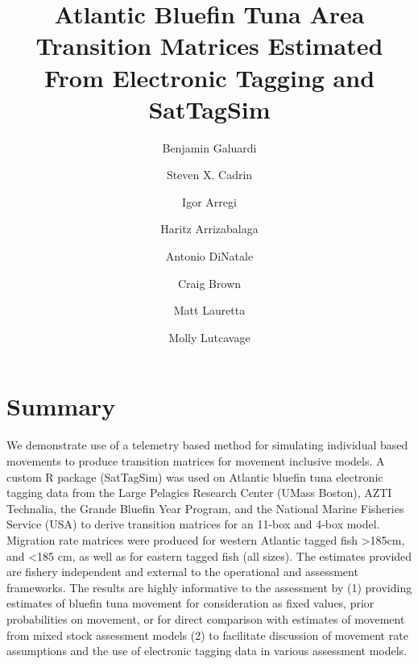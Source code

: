 \documentclass[
  authoryear,
  preprint,
  5p,
  onecolumn]{elsarticle}
\begin{document}
\begin{frontmatter}
\title{Atlantic Bluefin Tuna Area Transition Matrices Estimated From
Electronic Tagging and SatTagSim}
\author[1]{Benjamin Galuardi%
%
}
\author[1]{Steven X. Cadrin%
%
}

\author[2]{Igor Arregi%
%
}

\author[2]{Haritz Arrizabalaga%
%
}

\author[3]{Antonio DiNatale%
%
}

\author[4]{Craig Brown%
%
}

\author[4]{Matt Lauretta%
%
}

\author[5]{Molly Lutcavage%
%
}











        





\end{frontmatter}
    

\section{Summary}\label{summary}

We demonstrate use of a telemetry based method for simulating individual
based movements to produce transition matrices for movement inclusive
models. A custom R package (SatTagSim) was used on Atlantic bluefin tuna
electronic tagging data from the Large Pelagics Research Center (UMass
Boston), AZTI Technalia, the Grande Bluefin Year Program, and the
National Marine Fisheries Service (USA) to derive transition matrices
for an 11-box and 4-box model. Migration rate matrices were produced for
western Atlantic tagged fish \textgreater185cm, and \textless185 cm, as
well as for eastern tagged fish (all sizes). The estimates provided are
fishery independent and external to the operational and assessment
frameworks. The results are highly informative to the assessment by (1)
providing estimates of bluefin tuna movement for consideration as fixed
values, prior probabilities on movement, or for direct comparison with
estimates of movement from mixed stock assessment models (2) to
facilitate discussion of movement rate assumptions and the use of
electronic tagging data in various assessment models.
\end{document}
